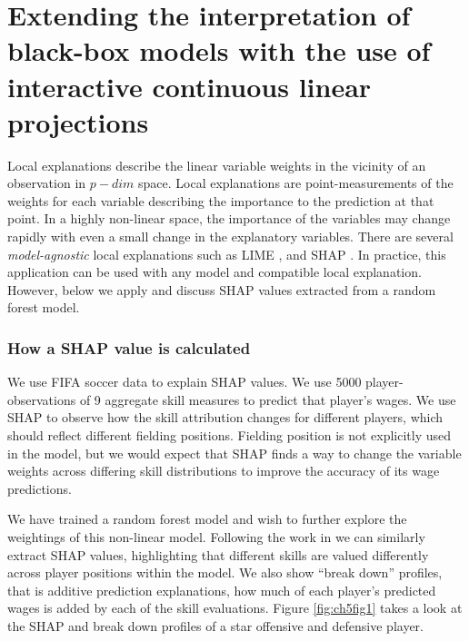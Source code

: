 \documentclass{template/monashthesis}
\begin{document}
\hypertarget{extending-the-interpretation-of-black-box-models-with-the-use-of-interactive-continuous-linear-projections}{%
\section{Extending the interpretation of black-box models with the use of interactive continuous linear projections}\label{extending-the-interpretation-of-black-box-models-with-the-use-of-interactive-continuous-linear-projections}}

Local explanations describe the linear variable weights in the vicinity of an observation in \(p-dim\) space. Local explanations are point-measurements of the weights for each variable describing the importance to the prediction at that point. In a highly non-linear space, the importance of the variables may change rapidly with even a small change in the explanatory variables. There are several \emph{model-agnostic} local explanations such as LIME \autocite{ribeiro_why_2016}, and SHAP \autocite{lundberg_unified_2017}. In practice, this application can be used with any model and compatible local explanation. However, below we apply and discuss SHAP values extracted from a random forest model.

\hypertarget{how-a-shap-value-is-calculated}{%
\subsubsection{How a SHAP value is calculated}\label{how-a-shap-value-is-calculated}}

We use FIFA soccer data \autocite{leone_fifa_2020} to explain SHAP values. We use 5000 player-observations of 9 aggregate skill measures to predict that player's wages. We use SHAP to observe how the skill attribution changes for different players, which should reflect different fielding positions. Fielding position is not explicitly used in the model, but we would expect that SHAP finds a way to change the variable weights across differing skill distributions to improve the accuracy of its wage predictions.

We have trained a random forest model and wish to further explore the weightings of this non-linear model. Following the work in \autocite{biecek_dalex_2018,biecek_explanatory_2021} we can similarly extract SHAP values, highlighting that different skills are valued differently across player positions within the model. We also show ``break down'' profiles, that is additive prediction explanations, how much of each player's predicted wages is added by each of the skill evaluations. Figure \ref{fig:ch5fig1} takes a look at the SHAP and break down profiles of a star offensive and defensive player.
\end{document}
